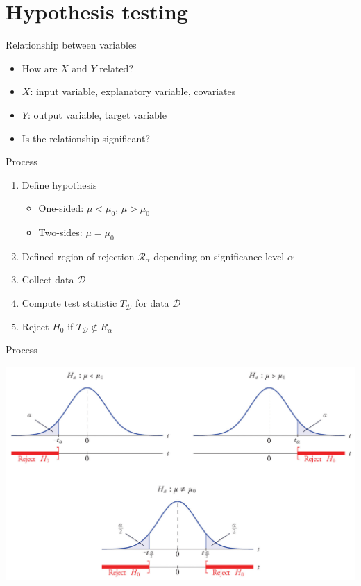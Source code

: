 \documentclass{beamer}\usepackage[]{graphicx}\usepackage[]{color}
\begin{document}
\section{Hypothesis testing}
\begin{frame}
\tableofcontents[currentsection]
\end{frame}

\begin{frame}{Relationship between variables}
  \begin{itemize}
    \item How are $X$ and $Y$ related?
    \item $X$: input variable, explanatory variable, covariates
    \item $Y$: output variable, target variable
    \item Is the relationship significant?
  \end{itemize}
\end{frame}

\begin{frame}{Process}
  \begin{enumerate}
    \item Define hypothesis
      \begin{itemize}
        \item One-sided: $\mu < \mu_0$, $\mu > \mu_0$
        \item Two-sides: $\mu = \mu_0$
      \end{itemize}
    \item Defined region of rejection $\mathcal{R}_\alpha$ depending on
      significance level $\alpha$
    \item Collect data $\mathcal{D}$
    \item Compute test statistic $T_\mathcal{D}$ for data $\mathcal{D}$
    \item Reject $H_0$ if $T_\mathcal{D} \notin R_\alpha$
  \end{enumerate}
\end{frame}

\begin{frame}{Process}
  \begin{center}
    \includegraphics[width=.9\linewidth]{ht.jpg}
  \end{center}
\end{frame}
\end{document}

